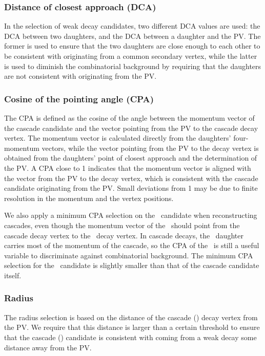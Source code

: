     \subsubsection{Distance of closest approach (DCA)}
      In the selection of weak decay candidates, two different DCA values are used: the DCA between two daughters, and the DCA between a daughter and the PV. The former is used to ensure that the two daughters are close enough to each other to be consistent with originating from a common secondary vertex, while the latter is used to diminish the combinatorial background by requiring that the daughters are not consistent with originating from the PV.

    \subsubsection{Cosine of the pointing angle (CPA)}
      The CPA is defined as the cosine of the angle between the momentum vector of the cascade candidate and the vector pointing from the PV to the cascade decay vertex. The momentum vector is calculated directly from the daughters' four-momentum vectors, while the vector pointing from the PV to the decay vertex is obtained from the daughters' point of closest approach and the determination of the PV. A CPA close to 1 indicates that the momentum vector is aligned with the vector from the PV to the decay vertex, which is consistent with the cascade candidate originating from the PV. Small deviations from 1 may be due to finite resolution in the momentum and the vertex positions.

      We also apply a minimum CPA selection on the \Lambda\ candidate when reconstructing cascades, even though the momentum vector of the \Lambda\ should point from the cascade decay vertex to the \Lambda\ decay vertex. In cascade decays, the \Lambda\ daughter carries most of the momentum of the cascade, so the CPA of the \Lambda\ is still a useful variable to discriminate against combinatorial background. The minimum CPA selection for the \Lambda\ candidate is slightly smaller than that of the cascade candidate itself.

    \subsubsection{Radius}
      The radius selection is based on the distance of the cascade (\Lambda) decay vertex from the PV. We require that this distance is larger than a certain threshold to ensure that the cascade (\Lambda) candidate is consistent with coming from a weak decay some distance away from the PV. 
  
